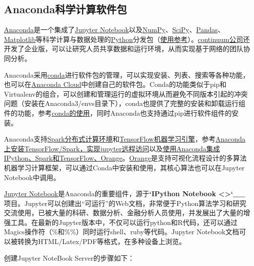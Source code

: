 \documentclass[letterpaper,10pt,english]{sphinxmanual}
\begin{document}
\subsection{Anaconda科学计算软件包}
\label{gispark_paas:Anaconda_u79d1_u5b66_u8ba1_u7b97_u8f6f_u4ef6_u5305}
\href{https://www.continuum.io/}{Anaconda}是一个集成了\href{http://jupyter.org/}{Jupyter
Notebook}以及\href{http://numpy.readthedocs.io/en/latest/}{NumPy}、\href{http://scipy.org/}{SciPy}、\href{http://pandas.pydata.org/}{Pandas}、\href{http://matplotlib.org/}{Matplotlib}等科学计算与数据处理的\href{http://www.python.org}{Python}分发包（\href{http://docs.anaconda.org/using.html}{使用参考}）。\href{https://www.continuum.io/}{continuum公司}还开发了企业版，可以让研究人员共享数据和运行环境，从而实现基于网络的团队协同分析。

Anaconda采用\href{http://conda.readthedocs.io/en/latest/}{conda}进行软件包的管理，可以实现安装、列表、搜索等各种功能，也可以在\href{http://anaconda.org}{Anaconda
Cloud}中创建自己的软件包。Conda的功能类似于pip和Virtualenv的组合，可以创建和管理运行的虚拟环境从而避免不同版本引起的冲突问题（安装在Anaconda3/envs目录下），conda也提供了完整的安装和卸载运行组件的功能，参考\href{http://my.oschina.net/u/2306127/blog/634674}{conda的使用}，同时Anaconda也支持通过pip进行软件组件的安装。

Anaconda支持\href{http://spark.apache.org}{Spark分布式计算环境}和\href{http://tensorflow.org/}{TensorFlow机器学习引擎}，参考\href{http://my.oschina.net/u/2306127/blog/636872}{Anaconda上安装TensorFlow/Spark，实现jupyter远程访问}以及\href{http://my.oschina.net/u/2306127/blog/636289}{使用Anaconda集成IPython、Spark和TensorFlow、Orange}。\href{http://orange.biolab.si/}{Orange}是支持可视化流程设计的多算法机器学习计算框架，可以通过Conda中安装和使用，其核心算法也可以在Jupyter
Notebook中调用。

\href{http://jupyter.org/}{Jupyter
Notebook}是Anaconda的重要组件，源于{\color{red}\bfseries{}{}`IPython
Notebook \textless{}\textgreater{}{}`\_\_}项目。Jupyter可以创建出“可运行”的Web文档，非常便于Python算法学习和研究交流使用，已被大量的科研、数据分析、金融分析人员使用，并发展出了大量的增强工具。在最新的Jupyter版本中，不仅可以运行python和R代码，还可以通过Magics操作符（\%和\%\%）同时运行shell、ruby等代码。Jupyter
Notebook文档可以被转换为HTML/Latex/PDF等格式，在多种设备上浏览。

创建Jupyter NoteBook Server的步骤如下：
\end{document}
